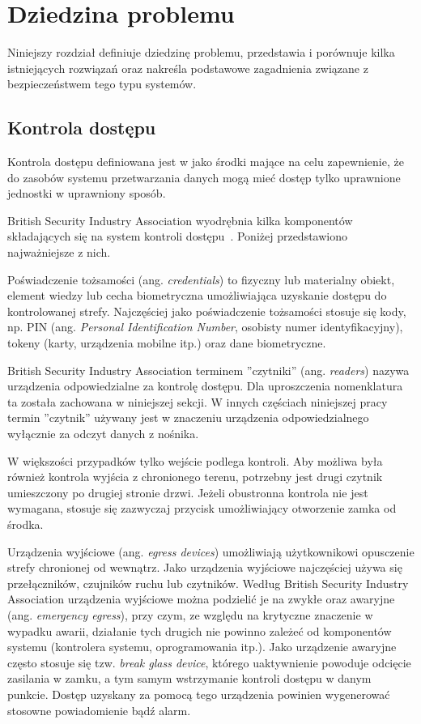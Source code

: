 \chapter{Dziedzina problemu}
\label{chap:problem-domain}

	Niniejszy rozdział definiuje dziedzinę problemu, przedstawia i porównuje kilka istniejących rozwiązań oraz nakreśla podstawowe zagadnienia związane z bezpieczeństwem tego typu systemów.

	\section{Kontrola dostępu}

		Kontrola dostępu definiowana jest w \cite{pkn2002} jako środki mające na celu zapewnienie, że do zasobów systemu przetwarzania danych mogą mieć dostęp tylko uprawnione jednostki w uprawniony sposób.

		British Security Industry Association wyodrębnia kilka komponentów składających się na system kontroli dostępu~\cite{bsia2016}. Poniżej przedstawiono najważniejsze z nich.

		Poświadczenie tożsamości (ang. \textit{credentials}) to fizyczny lub materialny obiekt, element wiedzy lub cecha biometryczna umożliwiająca uzyskanie dostępu do kontrolowanej strefy. Najczęściej jako poświadczenie tożsamości stosuje się kody, np. PIN (ang. \textit{Personal Identification Number}, osobisty numer identyfikacyjny), tokeny (karty, urządzenia mobilne itp.) oraz dane biometryczne.

		British Security Industry Association terminem ''czytniki'' (ang. \textit{readers}) nazywa urządzenia odpowiedzialne za kontrolę dostępu. Dla uproszczenia nomenklatura ta została zachowana w niniejszej sekcji. W innych częściach niniejszej pracy termin ''czytnik'' używany jest w znaczeniu urządzenia odpowiedzialnego wyłącznie za odczyt danych z nośnika.

		W większości przypadków tylko wejście podlega kontroli. Aby możliwa była również kontrola wyjścia z chronionego terenu, potrzebny jest drugi czytnik umieszczony po drugiej stronie drzwi. Jeżeli obustronna kontrola nie jest wymagana, stosuje się zazwyczaj przycisk umożliwiający otworzenie zamka od środka.

		Urządzenia wyjściowe (ang. \textit{egress devices}) umożliwiają użytkownikowi opusczenie strefy chronionej od wewnątrz. Jako urządzenia wyjściowe najczęściej używa się przełączników, czujników ruchu lub czytników. Według British Security Industry Association urządzenia wyjściowe można podzielić je na zwykłe oraz awaryjne (ang. \textit{emergency egress}), przy czym, ze względu na krytyczne znaczenie w wypadku awarii, działanie tych drugich nie powinno zależeć od komponentów systemu (kontrolera systemu, oprogramowania itp.). Jako urządzenie awaryjne często stosuje się tzw. \textit{break glass device}, którego uaktywnienie powoduje odcięcie zasilania w zamku, a tym samym wstrzymanie kontroli dostępu w danym punkcie. Dostęp uzyskany za pomocą tego urządzenia powinien wygenerować stosowne powiadomienie bądź alarm.

